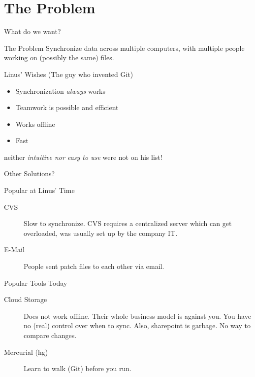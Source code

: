 \documentclass[xetex, handout]{beamer}
\begin{document}
\section{The Problem}

\begin{frame}{What do we want?}
  \begin{alertblock}{The Problem}
    Synchronize data across multiple computers, with multiple people working on
    (possibly the same) files.
  \end{alertblock}
  \pause

  \begin{block}{Linus' Wishes (The guy who invented Git)}
    \begin{itemize}
      \item Synchronization \emph{always} works
      \item Teamwork is possible and efficient
      \item Works offline
      \item Fast
    \end{itemize}
    neither \emph{intuitive nor easy to use} were not on his list!
  \end{block}
\end{frame}

\begin{frame}{Other Solutions?}
  \begin{block}{Popular at Linus' Time}
    \begin{description}
      \item[CVS] Slow to synchronize. CVS requires a centralized server which
        can get overloaded, was usually set up by the company IT.
      \item[E-Mail] People sent patch files to each other via email.
    \end{description}
  \end{block}
  \begin{block}{Popular Tools Today}
    \begin{description}
      \item[Cloud Storage] Does not work offline. Their whole business model is
        against you. You have no (real) control over when to sync. Also,
        sharepoint is garbage. No way to compare changes.

      \item[Mercurial (hg)] Learn to walk (Git) before you run.
    \end{description}
  \end{block}
\end{frame}
\end{document}
